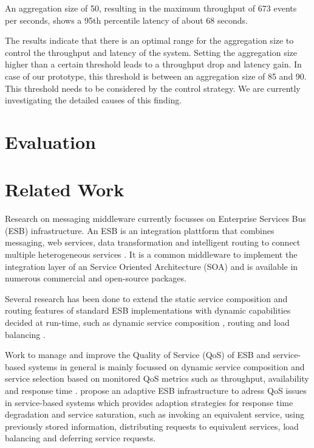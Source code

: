 An aggregation size of 50, resulting in the maximum throughput of 673 events per seconds, shows a 95th percentile latency of about 68 seconds.

The results indicate that there is an optimal range for the aggregation size to control the throughput and latency of the system. Setting the aggregation size higher than a certain threshold leads to a throughput drop and latency gain. In case of our prototype, this threshold is between an aggregation size of 85 and 90. This threshold needs to be considered by the control strategy. We are currently investigating the detailed causes of this finding.

\section{Evaluation}

\section{Related Work}\label{sec:related_work}
Research on messaging middleware currently focusses on Enterprise Services Bus (ESB) infrastructure. An ESB is an integration plattform that combines messaging, web services, data transformation and intelligent routing to connect multiple heterogeneous services \citep{Chappell:2004jo}. It is a common middleware to implement the integration layer of an Service Oriented Architecture (SOA) and is available in numerous commercial and open-source packages.

Several research has been done to extend the static service composition and routing features of standard ESB implementations with dynamic capabilities decided at run-time, such as dynamic service composition \citep{Chang:2007aa}, routing \citep{Bai:2007aa} \citep{Wu:2008aa} \citep{Ziyaeva:2008aa} and load balancing \citep{Jongtaveesataporn:2010aa}.

Work to manage and improve the Quality of Service (QoS) of ESB and service-based systems in general is mainly focussed on dynamic service composition and service selection based on monitored QoS metrics such as throughput, availability and response time \citep{Calinescu:2011aa}. \cite{Gonzalez:2011} propose an adaptive ESB infrastructure to adress QoS issues in service-based systems which provides adaption strategies for response time degradation and service saturation, such as invoking an equivalent service, using previously stored information, distributing requests to equivalent services, load balancing and deferring service requests.

